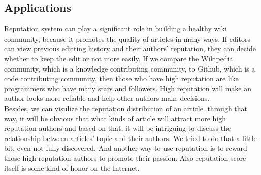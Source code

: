 \documentclass[preprint,review,12pt]{elsarticle}
\begin{document}
\subsection{Applications}
Reputation system can play a significant role in building a healthy wiki
community, because it promotes the quality of articles in many ways. If editors
can view previous editting history and their authors' reputation, they can
decide whether to keep the edit or not more easily. If we compare the Wikipedia
community, which is a knowledge contributing community, to Github, which is a
code contributing community, then those who have high reputation are like
programmers who have many stars and followers. High reputation will make an
author looks more reliable and help other authors make decisions.\\
Besides, we can visulize the reputation distribution of an article. through that
way, it will be obvious that what kinds of article will attract more high
reputation authors and based on that, it will be intriguing to discuss the
relationship between articles' topic and their authors. We tried to do that a
little bit, even not fully discovered. And another way to use reputation is to
reward those high reputation authors to promote their passion. Also reputation
score itself is some kind of honor on the Internet.


\end{document}
